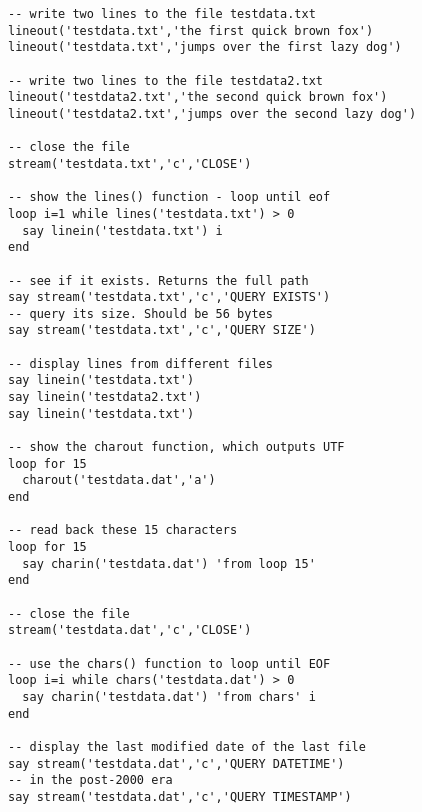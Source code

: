 \begin{lstlisting}[label=datessexample,caption=Example of using Date()]
-- write two lines to the file testdata.txt
lineout('testdata.txt','the first quick brown fox')
lineout('testdata.txt','jumps over the first lazy dog')

-- write two lines to the file testdata2.txt
lineout('testdata2.txt','the second quick brown fox')
lineout('testdata2.txt','jumps over the second lazy dog')

-- close the file
stream('testdata.txt','c','CLOSE')

-- show the lines() function - loop until eof
loop i=1 while lines('testdata.txt') > 0
  say linein('testdata.txt') i
end

-- see if it exists. Returns the full path
say stream('testdata.txt','c','QUERY EXISTS')
-- query its size. Should be 56 bytes
say stream('testdata.txt','c','QUERY SIZE')

-- display lines from different files 
say linein('testdata.txt')
say linein('testdata2.txt')
say linein('testdata.txt')

-- show the charout function, which outputs UTF
loop for 15
  charout('testdata.dat','a')
end

-- read back these 15 characters
loop for 15
  say charin('testdata.dat') 'from loop 15'
end

-- close the file
stream('testdata.dat','c','CLOSE')

-- use the chars() function to loop until EOF
loop i=i while chars('testdata.dat') > 0
  say charin('testdata.dat') 'from chars' i
end

-- display the last modified date of the last file
say stream('testdata.dat','c','QUERY DATETIME')
-- in the post-2000 era
say stream('testdata.dat','c','QUERY TIMESTAMP')

\end{lstlisting}
